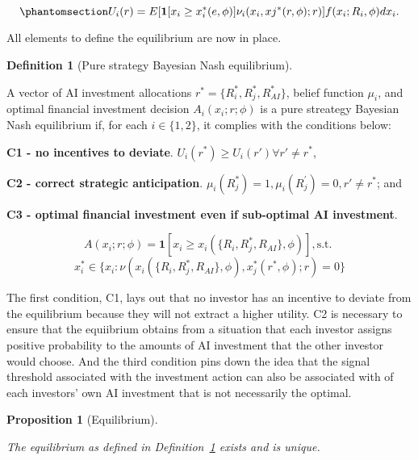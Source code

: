 \documentclass[
]{article}
\theoremstyle{plain}
\newtheorem{proposition}{Proposition}[section]
\theoremstyle{definition}
\newtheorem{definition}{Definition}[section]
\theoremstyle{remark}
\begin{document}
\begin{equation}\phantomsection\label{eq-expectedutil}{
U_i(r) = E[\mathbf{1}[x_i \geq x_i^*(e, \phi)] \nu_i(x_i, xj^*(r, \phi); r)]f(x_i;R_i, \phi)dx_i.
}\end{equation}

All elements to define the equilibrium are now in place.

\begin{definition}[Pure strategy Bayesian Nash
equilibrium]\protect\hypertarget{def-equilibrium}{}\label{def-equilibrium}

A vector of AI investment allocations
\(r^* = \{R_i^*, R_j^*, R_{AI}^*\}\), belief function \(\mu_i\), and
optimal financial investment decision \(A_i(x_i;r;\phi)\) is a pure
streategy Bayesian Nash equilibrium if, for each \(i \in \{1,2\}\), it
complies with the conditions below:

\textbf{C1 - no incentives to deviate}.
\(U_i(r^*) \geq U_i(r') \forall r' \neq r^*\),

\textbf{C2 - correct strategic anticipation}.
\(\mu_i(R_j^*)=1, \mu_i(R_j^{'}) = 0, r' \neq r^*\); and

\textbf{C3 - optimal financial investment even if sub-optimal AI
investment}.

\[
A(x_i;r;\phi) = \mathbf{1}[x_i \geq x_i(\{R_i, R_j^*, R_{AI}\}, \phi)], \text{s.t.  }
\] \[
x_i^* \in \{x_i : \nu(x_i(\{R_i, R_j^*, R_{AI}\}, \phi), x_j^*(r^*, \phi); r) = 0 \}
\]

\end{definition}

The first condition, C1, lays out that no investor has an incentive to
deviate from the equilibrium because they will not extract a higher
utility. C2 is necessary to ensure that the equiibrium obtains from a
situation that each investor assigns positive probability to the amounts
of AI investment that the other investor would choose. And the third
condition pins down the idea that the signal threshold associated with
the investment action can also be associated with of each investors' own
AI investment that is not necessarily the optimal.

\begin{proposition}[Equilibrium]\protect\hypertarget{prp-equilibrium}{}\label{prp-equilibrium}

The equilibrium as defined in Definition~\ref{def-equilibrium} exists
and is unique.

\end{proposition}
\end{document}
